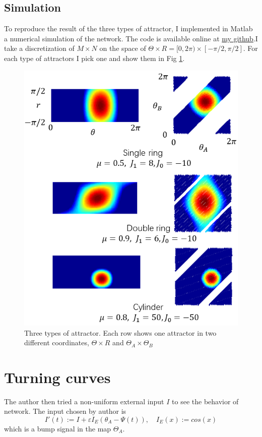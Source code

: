 \documentclass{article}
\begin{document}
	\subsection{Simulation}
	To reproduce the result of the three types of attractor, I implemented in Matlab a numerical simulation of the network. The code is available online at \href{https://github.com/flm8620/Continuous-attractor-network}{my github}.I take a discretization of $M\times N$ on the space of $\Theta\times R = [0,2\pi)\times[-\pi/2,\pi/2]$. For each type of attractors I pick one and show them in Fig \ref{fig:type}.
	
	\begin{figure}[h]
		\centering
		\includegraphics[width=12cm]{figures.png}
		\caption{Three types of attractor. Each row shows one attractor in two different coordinates, $\Theta\times R$ and $\Theta_A\times\Theta_B$}
		\label{fig:type}
	\end{figure}

	\section{Turning curves}
	The author then tried a non-uniform external input $I$ to see the behavior of network. The input chosen by author is 
	\begin{equation}
	I'(t) := I + \varepsilon I_E(\theta_A-\Psi(t)),\quad I_E(x) := cos(x)
	\end{equation}
	which is a bump signal in the map $\Theta_A$. 
	
\end{document}
